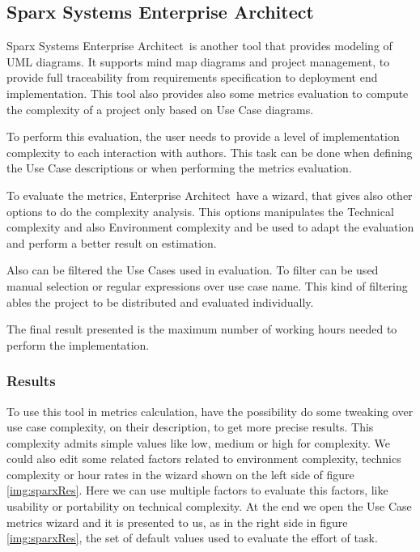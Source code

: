 \subsection{Sparx Systems Enterprise Architect}
\def \entArch {\textsf{Enterprise Architect}}
Sparx Systems \entArch\ is another tool that provides modeling of UML diagrams.
It supports mind map diagrams and project management, to provide full traceability from requirements specification to deployment end implementation.
This tool also provides also some metrics evaluation to compute the complexity of a project only based on Use Case diagrams. 

To perform this evaluation, the user needs to provide a level of implementation complexity to each interaction with authors. 
This task can be done when defining the Use Case descriptions or when performing the metrics evaluation.

To evaluate the metrics, \entArch\ have a wizard, that gives also other options to do the complexity analysis.
This options manipulates the Technical complexity and also Environment complexity and be used to adapt the evaluation and perform a better result on estimation.

Also can be filtered the Use Cases used in evaluation. 
To filter can be used manual selection or regular expressions over use case name.
This kind of filtering ables the project to be distributed and evaluated individually.

The final result presented is the maximum number of working hours needed to perform the implementation.

\subsubsection{Results}

To use this tool in metrics calculation, have the possibility do some tweaking over use case complexity, on their description, to get more precise results. This complexity admits simple values like low, medium or high for complexity.
We could also edit some related factors related to environment complexity, technics complexity or hour rates in the wizard shown on the left side of figure \ref{img:sparxRes}. Here we can use multiple factors to evaluate this factors, like usability or portability on technical complexity.
At the end we open the Use Case metrics wizard and it is presented to us, as in the right side in figure \ref{img:sparxRes}, the set of default values used to evaluate the effort of task.

